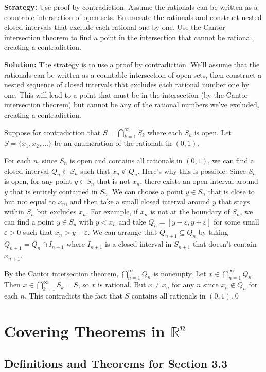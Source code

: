 \noindent\textbf{Strategy:} Use proof by contradiction. Assume the rationals can be written as a countable intersection of open sets. Enumerate the rationals and construct nested closed intervals that exclude each rational one by one. Use the Cantor intersection theorem to find a point in the intersection that cannot be rational, creating a contradiction.

\bigskip\noindent\textbf{Solution:} The strategy is to use a proof by contradiction. We'll assume that the rationals can be written as a countable intersection of open sets, then construct a nested sequence of closed intervals that excludes each rational number one by one. This will lead to a point that must be in the intersection (by the Cantor intersection theorem) but cannot be any of the rational numbers we've excluded, creating a contradiction.

Suppose for contradiction that $S = \bigcap_{k=1}^{\infty} S_k$ where each $S_k$ is open. Let $S = \{x_1, x_2, \ldots\}$ be an enumeration of the rationals in $(0,1)$.

For each $n$, since $S_n$ is open and contains all rationals in $(0,1)$, we can find a closed interval $Q_n \subset S_n$ such that $x_n \notin Q_n$. Here's why this is possible: Since $S_n$ is open, for any point $y \in S_n$ that is not $x_n$, there exists an open interval around $y$ that is entirely contained in $S_n$. We can choose a point $y \in S_n$ that is close to but not equal to $x_n$, and then take a small closed interval around $y$ that stays within $S_n$ but excludes $x_n$. For example, if $x_n$ is not at the boundary of $S_n$, we can find a point $y \in S_n$ with $y < x_n$ and take $Q_n = [y - \varepsilon, y + \varepsilon]$ for some small $\varepsilon > 0$ such that $x_n > y + \varepsilon$. We can arrange that $Q_{n+1} \subseteq Q_n$ by taking $Q_{n+1} = Q_n \cap I_{n+1}$ where $I_{n+1}$ is a closed interval in $S_{n+1}$ that doesn't contain $x_{n+1}$.

By the Cantor intersection theorem, $\bigcap_{n=1}^{\infty} Q_n$ is nonempty. Let $x \in \bigcap_{n=1}^{\infty} Q_n$. Then $x \in \bigcap_{k=1}^{\infty} S_k = S$, so $x$ is rational. But $x \neq x_n$ for any $n$ since $x_n \notin Q_n$ for each $n$. This contradicts the fact that $S$ contains all rationals in $(0,1)$.\qed
\section{Covering Theorems in $\mathbb{R}^n$}

\subsection*{Definitions and Theorems for Section 3.3}

